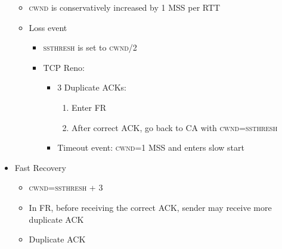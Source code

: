 \begin{itemize}
    \begin{itemize}

      \item \textsc{cwnd} is conservatively increased by 1 MSS per RTT

      \item Loss event

        \begin{itemize}

          \item \textsc{ssthresh} is set to \textsc{cwnd/2}

          \item TCP Reno:

            \begin{itemize}

              \item 3 Duplicate ACKs:

                \begin{enumerate}

                  \item Enter FR

                  \item After correct ACK, go back to CA with \textsc{cwnd=ssthresh}

                \end{enumerate}

              \item Timeout event: \textsc{cwnd=1} MSS and enters slow start

            \end{itemize}

        \end{itemize}

    \end{itemize}

  \item Fast Recovery

    \begin{itemize}

      \item \textsc{cwnd=ssthresh} + 3

      \item In FR, before receiving the correct ACK, sender may receive more duplicate ACK

      \item Duplicate ACK

        \begin{itemize}


\end{itemize}
\end{itemize}
\end{itemize}
